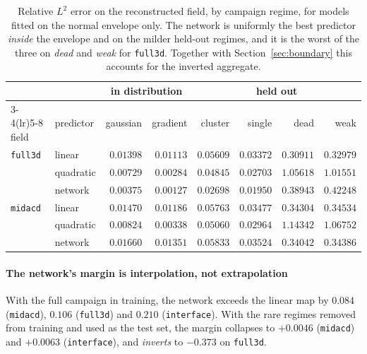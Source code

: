 \documentclass[11pt,a4paper]{article}
\theoremstyle{plain}
\theoremstyle{definition}
\theoremstyle{remark}
\begin{document}
\begin{table}[t]
\centering
\small
\begin{tabular}{@{}llrrrrrr@{}}
\toprule
& & \multicolumn{2}{c}{in distribution} & \multicolumn{4}{c}{held out} \\
\cmidrule(lr){3-4}\cmidrule(lr){5-8}
field & predictor & gaussian & gradient & cluster & single & dead & weak \\
\midrule
\texttt{full3d}
 & linear    & $0.01398$ & $0.01113$ & $0.05609$ & $0.03372$ & $0.30911$ & $0.32979$ \\
 & quadratic & $0.00729$ & $0.00284$ & $0.04845$ & $0.02703$ & $1.05618$ & $1.01551$ \\
 & network   & $\mathbf{0.00375}$ & $\mathbf{0.00127}$ & $\mathbf{0.02698}$ & $\mathbf{0.01950}$ & $0.38943$ & $0.42248$ \\
\midrule
\texttt{midacd}
 & linear    & $0.01470$ & $0.01186$ & $0.05763$ & $0.03477$ & $\mathbf{0.34304}$ & $\mathbf{0.34534}$ \\
 & quadratic & $0.00824$ & $0.00338$ & $0.05060$ & $0.02964$ & $1.14342$ & $1.06752$ \\
 & network   & $0.01660$ & $0.01351$ & $0.05833$ & $0.03524$ & $0.34042$ & $0.34386$ \\
\bottomrule
\end{tabular}
\caption{Relative $L^2$ error on the reconstructed field, by campaign regime,
for models fitted on the normal envelope only. The network is uniformly the best
predictor \emph{inside} the envelope and on the milder held-out regimes, and it
is the worst of the three on \textit{dead} and \textit{weak} for
\texttt{full3d}. Together with Section~\ref{sec:boundary} this
accounts for the inverted aggregate.}
\label{tab:regimes}
\end{table}

\label{meas:margin}
\paragraph{The network's margin is interpolation, not extrapolation}
With the full campaign in training, the network exceeds the linear map by
$0.084$ (\texttt{midacd}), $0.106$ (\texttt{full3d}) and $0.210$
(\texttt{interface}). With the rare regimes removed from training and used as
the test set, the margin collapses to $+0.0046$ (\texttt{midacd}) and
$+0.0063$ (\texttt{interface}), and \emph{inverts} to $-0.373$ on
\texttt{full3d}.
\end{document}
